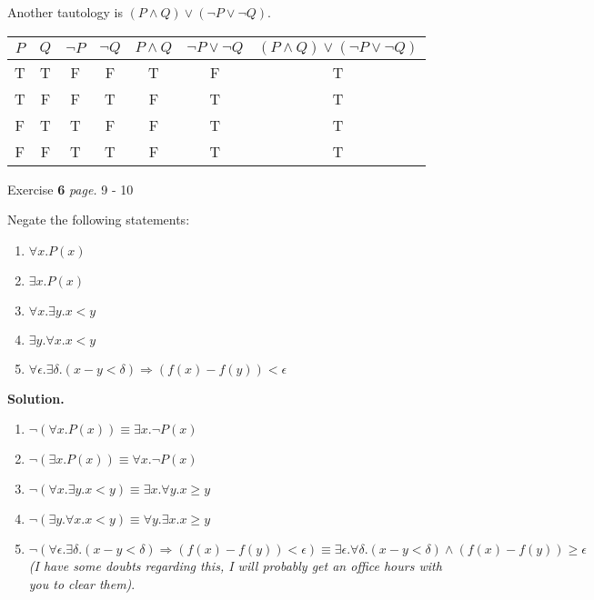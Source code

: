 \documentclass[11pt]{article}
\newcommand{\problem
}[2]{
\begin{mdframed}
    Exercise \textbf{#1} \hfill \emph{page. }#2
\end{mdframed}
}
\begin{document}
\noindent Another tautology is $(P \land Q) \lor (\neg P \lor \neg Q)$.
\begin{center}
	\begin{tabular}{|c|c|c|c|c|c|c|}
		\hline
		$P$ & $Q$ & $\neg P$ & $\neg Q$ & $P \land Q$ & $\neg P \lor \neg Q$ & $(P \land Q) \lor (\neg P \lor \neg Q)$ \\
		\hline
		T   & T   & F        & F        & T           & F                    & T                                       \\
		T   & F   & F        & T        & F           & T                    & T                                       \\
		F   & T   & T        & F        & F           & T                    & T                                       \\
		F   & F   & T        & T        & F           & T                    & T                                       \\
		\hline
	\end{tabular}
\end{center}



\problem{6}{9 - 10}
Negate the following statements:
\begin{enumerate}
	\item $\forall x.P(x)$
	\item $\exists x.P(x)$
	\item $\forall x. \exists y. x < y$
	\item $\exists y. \forall x. x < y$
	\item $\forall \epsilon . \exists \delta .(x-y<\delta) \Longrightarrow(f(x)-f(y))<\epsilon$
\end{enumerate}

\textbf{Solution. }
\begin{enumerate}
	\item $\neg(\forall x.P(x)) \equiv \exists x.\neg P(x)$
	\item $\neg(\exists x.P(x)) \equiv \forall x.\neg P(x)$
	\item $\neg(\forall x. \exists y. x < y) \equiv \exists x. \forall y. x \geq y$
	\item $\neg(\exists y. \forall x. x < y) \equiv \forall y. \exists x. x \geq y$
	\item $\neg(\forall \epsilon . \exists \delta .(x-y<\delta) \Longrightarrow(f(x)-f(y))<\epsilon) \equiv \exists \epsilon . \forall \delta .(x-y<\delta) \land (f(x)-f(y)) \geq \epsilon$ \\ \emph{(I have some doubts regarding this, I will probably get an office hours with you to clear them)}.
\end{enumerate}
\end{document}
